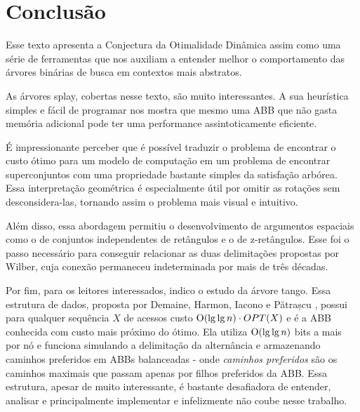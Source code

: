 
\chapter{Conclusão}
\label{cap:conclusao}

Esse texto apresenta a Conjectura da Otimalidade Dinâmica assim como uma série de ferramentas que nos auxiliam a entender melhor o comportamento das árvores binárias de busca em contextos mais abstratos.

As árvores splay, cobertas nesse texto, são muito interessantes. A sua heurística simples e fácil de programar nos mostra que mesmo uma ABB que não gasta memória adicional pode ter uma performance assintoticamente eficiente.

É impressionante perceber que é possível traduzir o problema de encontrar o custo ótimo para um modelo de computação em um problema de encontrar superconjuntos com uma propriedade bastante simples da satisfação arbórea. Essa interpretação geométrica é especialmente útil por omitir as rotações sem desconsidera-las, tornando assim o problema  mais visual e intuitivo. 

Além disso, essa abordagem permitiu o desenvolvimento de argumentos espaciais como o de conjuntos independentes de retângulos e o de z-retângulos. Esse foi o passo necessário para conseguir relacionar as duas delimitações propostas por Wilber, cuja conexão permaneceu indeterminada por mais de três décadas.

Por fim, para os leitores interessados, indico o estudo da árvore tango. Essa estrutura de dados, proposta por Demaine, Harmon, Iacono e Pătrașcu  \cite{dynamicoptimality}, possui para qualquer sequência $X$ de acessos custo $\mathrm{O}(\lg \lg n) \cdot OPT(X)$ e é a ABB conhecida com custo mais próximo do ótimo. Ela utiliza $\mathrm{O}(\lg \lg n)$ bits a mais por nó e funciona simulando a delimitação da alternância e armazenando caminhos preferidos em ABBs balanceadas - onde \textit{caminhos preferidos} são os caminhos maximais que passam apenas por filhos preferidos da ABB. Essa estrutura, apesar de muito interessante, é bastante desafiadora de entender, analisar e principalmente implementar e infelizmente não coube nesse trabalho.